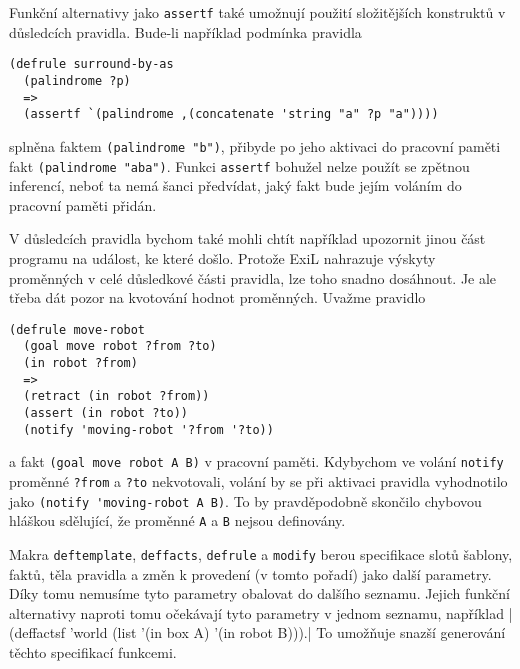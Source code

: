 Funkční alternativy jako \verb|assertf| také umožnují použití složitějších
konstruktů v důsledcích pravidla. Bude-li například podmínka pravidla
\begin{verbatim}
(defrule surround-by-as
  (palindrome ?p)
  =>
  (assertf `(palindrome ,(concatenate 'string "a" ?p "a"))))
\end{verbatim}
splněna faktem \verb|(palindrome "b")|, přibyde po jeho aktivaci do pracovní
paměti fakt \verb|(palindrome "aba")|. Funkci \verb|assertf| bohužel nelze
použít se zpětnou inferencí, neboť ta nemá šanci předvídat, jaký fakt bude
jejím voláním do pracovní paměti přidán.

V důsledcích pravidla bychom také mohli chtít například upozornit jinou část
programu na událost, ke které došlo. Protože ExiL nahrazuje výskyty
proměnných v celé důsledkové části pravidla, lze toho snadno dosáhnout. Je ale
třeba dát pozor na kvotování hodnot proměnných. Uvažme pravidlo
\begin{verbatim}
(defrule move-robot
  (goal move robot ?from ?to)
  (in robot ?from)
  =>
  (retract (in robot ?from))
  (assert (in robot ?to))
  (notify 'moving-robot '?from '?to))
\end{verbatim}
a fakt \verb|(goal move robot A B)| v pracovní paměti. Kdybychom ve volání
\verb|notify| proměnné \verb|?from| a \verb|?to| nekvotovali, volání by se při
aktivaci pravidla vyhodnotilo jako \verb|(notify 'moving-robot A B)|. To by
pravděpodobně skončilo chybovou hláškou sdělující, že proměnné \verb|A| a
\verb|B| nejsou definovány.

Makra \verb|deftemplate|, \verb|deffacts|, \verb|defrule| a \verb|modify| berou
specifikace slotů šablony, faktů, těla pravidla a změn k provedení (v tomto
pořadí) jako další parametry. Díky tomu nemusíme tyto parametry obalovat do
dalšího seznamu. Jejich funkční alternativy naproti tomu očekávají tyto
parametry v jednom seznamu, například
\cl|(deffactsf 'world (list '(in box A) '(in robot B))).|
To umožňuje snazší generování těchto specifikací funkcemi.
